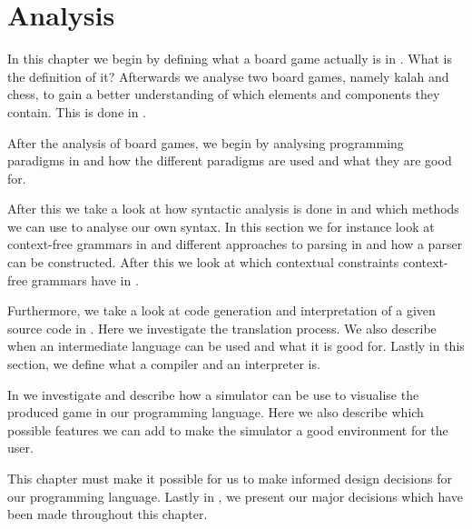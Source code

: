 \chapter{Analysis}
\label{chap:analysis}

In this chapter we begin by defining what a board game actually is in
. What is the definition of it? Afterwards we
analyse two board games, namely kalah and chess, to gain a better understanding
of which elements and components they contain. This is done in
.

After the analysis of board games, we begin by analysing programming paradigms
in  and how the different paradigms are used and what they
are good for. 

After this we take a look at how syntactic analysis is done in
 and which methods we can use to analyse our own
syntax. In this section we for instance look at context-free grammars in and
different approaches to parsing in and how a parser can be constructed. After
this we look at which contextual constraints context-free grammars have in
.

Furthermore, we take a look at code generation and interpretation of a given
source code in . Here we investigate
the translation process. We also describe when an intermediate language can be
used and what it is good for. Lastly in this section, we define what a compiler
and an interpreter is.

In  we investigate and describe how a simulator can be use
to visualise the produced game in our programming language. Here we also
describe which possible features we can add to make the simulator a good
environment for the user.

This chapter must make it possible for us to make informed design decisions for
our programming language. Lastly in , we present
our major decisions which have been made throughout this chapter.









